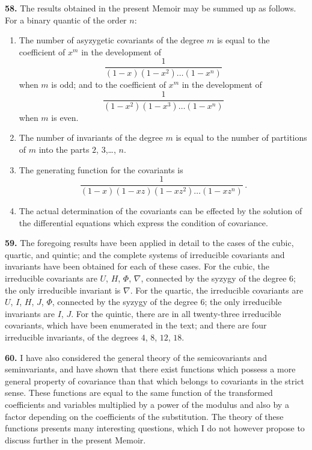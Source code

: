 \documentclass[11pt,a4paper]{book}
\begin{document}
\textbf{58.} The results obtained in the present Memoir may be summed up as follows. For a binary quantic of the order $n$:
\begin{enumerate}[label=(\arabic*)]
\item The number of asyzygetic covariants of the degree $m$ is equal to the coefficient of $x^{m}$ in the development of
\[
\frac{1}{(1-x)(1-x^{2})\ldots(1-x^{n})}
\]
when $m$ is odd; and to the coefficient of $x^{m}$ in the development of
\[
\frac{1}{(1-x^{2})(1-x^{3})\ldots(1-x^{n})}
\]
when $m$ is even.
\item The number of invariants of the degree $m$ is equal to the number of partitions of $m$ into the parts $2$, $3$,\ldots, $n$.
\item The generating function for the covariants is
\[
\frac{1}{(1-x)(1-xz)(1-xz^{2})\ldots(1-xz^{n})}\,.
\]
\item The actual determination of the covariants can be effected by the solution of the differential equations which express the condition of covariance.
\end{enumerate}

\textbf{59.} The foregoing results have been applied in detail to the cases of the cubic, quartic, and quintic; and the complete systems of irreducible covariants and invariants have been obtained for each of these cases. For the cubic, the irreducible covariants are $U$, $H$, $\Phi$, $\nabla$, connected by the syzygy of the degree $6$; the only irreducible invariant is $\nabla$. For the quartic, the irreducible covariants are $U$, $I$, $H$, $J$, $\Phi$, connected by the syzygy of the degree $6$; the only irreducible invariants are $I$, $J$. For the quintic, there are in all twenty-three irreducible covariants, which have been enumerated in the text; and there are four irreducible invariants, of the degrees $4$, $8$, $12$, $18$.

\clearpage
\setcounter{page}{272}

\textbf{60.} I have also considered the general theory of the semicovariants and seminvariants, and have shown that there exist functions which possess a more general property of covariance than that which belongs to covariants in the strict sense. These functions are equal to the same function of the transformed coefficients and variables multiplied by a power of the modulus and also by a factor depending on the coefficients of the substitution. The theory of these functions presents many interesting questions, which I do not however propose to discuss further in the present Memoir.
\end{document}
